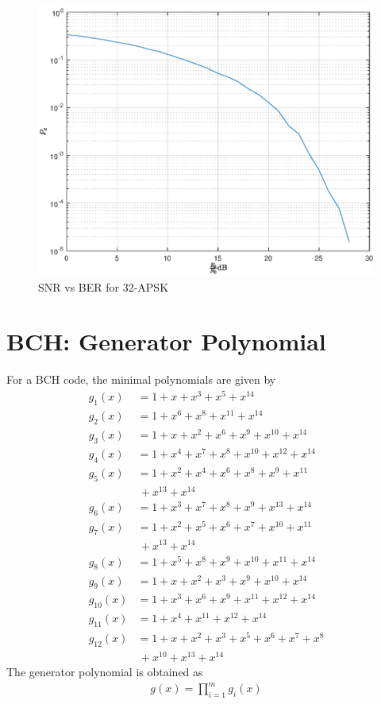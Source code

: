 \documentclass[journal,12pt,twocolumn]{IEEEtran}
\renewcommand\thesection{\arabic{section}}
\begin{document}
\begin{figure}[!ht]
\begin{center}
\includegraphics[width=\columnwidth]{./figs/apsk32}
\end{center}
\caption{SNR vs BER for 32-APSK}
\label{fig:32apsk1}
\end{figure}

\section{BCH: Generator Polynomial}
For a BCH code, the minimal polynomials are given by 
\begin{align}
g_1(x)&=1+x+x^3+x^5+x^{14}\\
g_2(x)&=1+x^6+x^8+x^{11}+x^{14}\\
g_3(x)&=1+x+x^2+x^6+x^9+x^{10}+x^{14}\\
g_4(x)&=1+x^4+x^7+x^8+x^10+x^{12}+x^{14}\\
g_5(x)&=1+x^2+x^4+x^6+x^8+x^9+x^{11}
\nonumber \\
&\,+x^{13}+x^{14}\\
g_6(x)&=1+x^3+x^7+x^8+x^9+x^{13}+x^{14}\\
g_7(x)&=1+x^2+x^5+x^6+x^7+x^{10}+x^{11}
\nonumber \\
&\,+x^{13}+x^{14}\\
g_8(x)&=1+x^5+x^8+x^9+x^{10}+x^{11}+x^{14}\\
g_9(x)&=1+x+x^2+x^3+x^9+x^{10}+x^{14}\\
g_{10}(x)&=1+x^3+x^6+x^9+x^{11}+x^{12}+x^{14}\\
g_{11}(x)&=1+x^4+x^{11}+x^{12}+x^{14}\\
g_{12}(x)&=1+x+x^2+x^3+x^5+x^6+x^7+x^8
\nonumber \\
&\,+x^{10}+x^{13}+x^{14}
\end{align}
The generator polynomial is obtained as
\begin{align}
g(x) =\prod_{i = 1}^{m}g_i(x)
\end{align}
\end{document}
